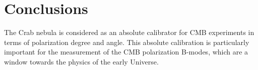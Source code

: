 \documentclass[twocolumn,traditabstract]{aa}
\def\NIKA{\textit{NIKA}}
\begin{document}





\section{Conclusions}\label{sec:conclusions}
The Crab nebula is considered as an absolute calibrator for CMB experiments in terms of polarization degree and angle. This absolute calibration is particularly important for the measurement of the CMB polarization B-modes, which are a window towards the physics of the early Universe.
\end{document}
